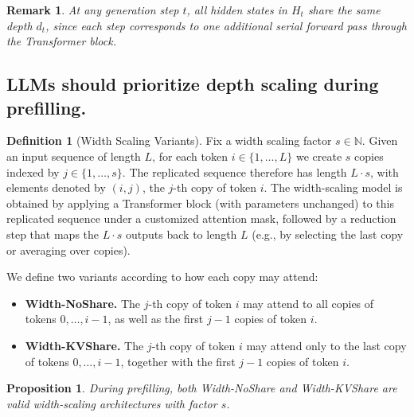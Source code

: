 \documentclass{article} %
\newtheorem{proposition}[theorem]{Proposition}
\theoremstyle{definition}
\newtheorem{definition}[theorem]{Definition}
\theoremstyle{plain}
\newtheorem{remark}[theorem]{Remark}
\begin{document}
\begin{remark}
At any generation step $t$, all hidden states in $H_t$ share the same depth $d_t$, 
since each step corresponds to one additional serial forward pass through the Transformer block.
\end{remark}

\subsection{LLMs should prioritize depth scaling during prefilling.}

\begin{definition}[Width Scaling Variants]
Fix a width scaling factor $s \in \mathbb{N}$. 
Given an input sequence of length $L$, for each token $i \in \{1,\dots,L\}$ 
we create $s$ copies indexed by $j \in \{1,\dots,s\}$. 
The replicated sequence therefore has length $L\cdot s$, with elements denoted by $(i,j)$, 
the $j$-th copy of token $i$. 
The width-scaling model is obtained by applying a Transformer block 
(with parameters unchanged) to this replicated sequence under a customized attention mask, 
followed by a reduction step that maps the $L\cdot s$ outputs back to length $L$ 
(e.g., by selecting the last copy or averaging over copies). 

We define two variants according to how each copy may attend:
\begin{itemize}[itemsep=0pt,topsep=0pt,leftmargin=*]
\item \textbf{Width-NoShare.} The $j$-th copy of token $i$ may attend to all copies of tokens $0,\dots,i-1$, 
as well as the first $j-1$ copies of token $i$.  

\item \textbf{Width-KVShare.} The $j$-th copy of token $i$ may attend only to the last copy of tokens $0,\dots,i-1$, 
together with the first $j-1$ copies of token $i$.
\end{itemize}
\end{definition}

\begin{proposition}
During prefilling, both \textsf{Width-NoShare} and \textsf{Width-KVShare} are valid 
width-scaling architectures with factor $s$.
\end{proposition}
\end{document}
